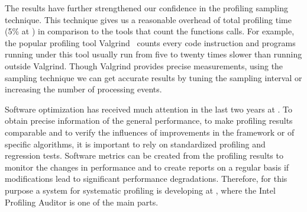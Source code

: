 The results have further strengthened our confidence in the profiling sampling
technique. This technique gives us a reasonable overhead of total profiling
time (5\% at \iamp) in comparison to the tools that count the functions calls.
For example, the popular profiling tool Valgrind~\cite{valgrind} counts every
code instruction and programs running under this tool usually run from five to
twenty times  slower than running outside Valgrind. Though Valgrind provides
precise measurements, using the sampling technique we can get accurate results
by tuning the sampling interval or increasing the number of processing events.

Software optimization has received much attention in the last two years at
\lhcb. To obtain precise information of the general performance, to make
profiling results comparable and to verify the influences of improvements in
the framework or of specific algorithms, it is important to rely on
standardized profiling and regression tests. Software metrics can be created
from the profiling results to monitor the changes in performance and to create
reports on a regular basis if modifications lead to significant
performance degradations. Therefore, for this purpose a system for systematic
profiling is developing at \lhcb, where the \gaudi Intel Profiling Auditor
is one of the main parts.
